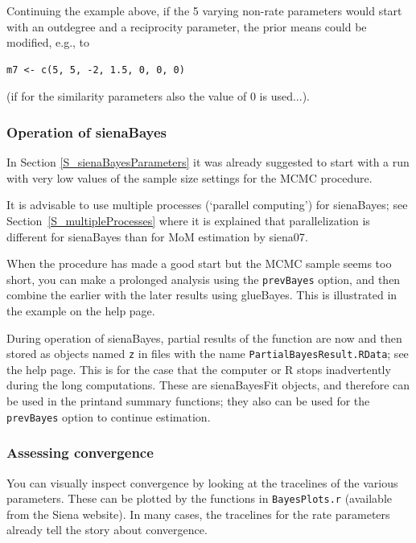 \documentclass[a4paper,fleqn,11pt]{article}
\newcommand{\+}{\, + \,}
\newcommand{\sfn}[1]{\textsf{#1}}
\newcommand{\R}{{\sf R }}
\begin{document}
Continuing the example above, if the 5 varying non-rate parameters would
start with an outdegree and a reciprocity parameter, the prior means
could be modified, e.g., to
\begin{verbatim}
m7 <- c(5, 5, -2, 1.5, 0, 0, 0)
\end{verbatim}
(if for the similarity parameters also the value of 0 is used...).


\subsubsection{Operation of \textsf{sienaBayes}}

In Section \ref{S_sienaBayesParameters} it was already suggested to
start with a run with very low values of the sample size settings for the
MCMC procedure.

It is advisable to use multiple processes (`parallel computing') for
\textsf{sienaBayes}; see Section~\ref{S_multipleProcesses} where it is explained
that parallelization is different for \textsf{sienaBayes} than for MoM
estimation by \textsf{siena07}.

When the procedure has made a good start but the MCMC sample seems too
short, you can make a prolonged analysis using the \texttt{prevBayes} option,
and then combine the earlier with the later results using \sfn{glueBayes}.
This is illustrated in the example on the help page.

During operation of \sfn{sienaBayes}, partial results of the function
are now and then stored
as objects named \texttt{z} in files with the name
\texttt{PartialBayesResult.RData}; see the help page.
This is for the case that the computer or \R stops inadvertently
during the long computations.
These are \sfn{sienaBayesFit} objects, and therefore can be used in the
\textsf{print}and \textsf{summary} functions; they also can be used for
the \texttt{prevBayes} option to continue estimation.

\subsubsection{Assessing convergence}

You can visually inspect convergence by looking at the tracelines of the
various parameters. These can be plotted by the functions in \texttt{BayesPlots.r}
(available from the Siena website). In many cases, the tracelines for
the rate parameters already tell the story about convergence.
\end{document}
